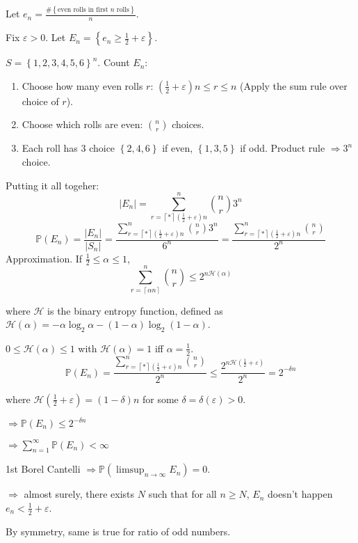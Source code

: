\documentclass[a4paper,11pt]{amsbook}
\theoremstyle{definition}
\theoremstyle{remark}
\renewcommand{\P}{\mathbb{P}}
\newcommand{\ceil}[1]{\left\lceil#1\right\rceil}
\newcommand\0{\varnothing}
\begin{document}
    Let $e_n=\frac{\#\left\{\text{even rolls in first $n$ rolls}\right\}}{n}$.
    
    Fix $\varepsilon>0$. Let $E_n=\left\{e_n\geq\frac12+\varepsilon\right\}$.

    $S=\left\{1,2,3,4,5,6\right\}^n$.
    Count $E_n$: \begin{enumerate}
        \item Choose how many even rolls $r$: $\left(\frac12+\varepsilon\right)n\leq r\leq n$
        (Apply the sum rule over choice of $r$).
        \item Choose which rolls are even: $\binom nr$ choices.
        \item Each roll has 3 choice $\left\{2,4,6\right\}$ if even, $\left\{1,3,5\right\}$ if odd.
        Product rule $\Rightarrow 3^n$ choice.\\
    \end{enumerate}

    Putting it all togeher: \let\Ho\H \renewcommand\H{\mathcal H} 
    $$|E_n|=\sum_{r=\ceil*{\left(\frac12+\varepsilon\right)n}}^n\binom nr3^n$$
    $$\P(E_n)=\frac{|E_n|}{|S_n|}=\frac{\sum_{r=\ceil*{\left(\frac12+\varepsilon\right)n}}^n\binom nr3^n}{6^n}=\frac{\sum_{r=\ceil*{\left(\frac12+\varepsilon\right)n}}^n\binom nr}{2^n}$$
    Approximation. If $\frac12\leq\alpha\leq1$,
    $$\sum_{r=\ceil{\alpha n}}^n\binom nr\leq2^{n\H(\alpha)}$$

    where $\H$ is the binary entropy function, defined as
    $\H(\alpha)=-\alpha\log_2\alpha-(1-\alpha)\log_2(1-\alpha)$.
    
    $0\leq\H(\alpha)\leq1$ with $\H(\alpha)=1$ iff $\alpha=\frac12$.
    $$\P(E_n)=\frac{\sum_{r=\ceil*{\left(\frac12+\varepsilon\right)n}}^n\binom nr}{2^n}\leq
    \frac{2^{n\H\left(\frac12+\varepsilon\right)}}{2^n}=2^{-\delta n}$$ 

    where $\H\left(\frac12+\varepsilon\right)=(1-\delta)n$ for some $\delta=\delta(\varepsilon)>0$.
    
    $\Rightarrow\P(E_n)\leq2^{-\delta n}$
    
    $\Rightarrow\sum_{n=1}^\infty\P(E_n)<\infty$
    
    1st Borel Cantelli $\Rightarrow\P(\limsup_{n\to\infty}E_n)=0$.
    
    $\Rightarrow$ almost surely, there exists $N$ such that for all $n\geq N$, $E_n$ doesn't happen
    $e_n<\frac12+\varepsilon$.
    
    By symmetry, same is true for ratio of odd numbers.
\end{document}
